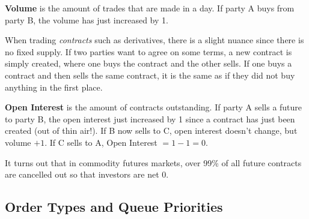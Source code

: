 \documentclass{article}
\begin{document}
    \begin{definition}[Volume]
      \textbf{Volume} is the amount of trades that are made in a day. If party A buys from party B, the volume has just increased by 1. 
    \end{definition}

    When trading \textit{contracts} such as derivatives, there is a slight nuance since there is no fixed supply. If two parties want to agree on some terms, a new contract is simply created, where one buys the contract and the other sells. If one buys a contract and then sells the same contract, it is the same as if they did not buy anything in the first place. 

    \begin{definition}
      \textbf{Open Interest} is the amount of contracts outstanding. If party A sells a future to party B, the open interest just increased by 1 since a contract has just been created (out of thin air!). If B now sells to C, open interest doesn't change, but volume $+1$. If C sells to A, Open Interest $= 1 - 1 = 0$.  
    \end{definition}

    It turns out that in commodity futures markets, over 99\% of all future contracts are cancelled out so that investors are net $0$. 

  \subsection{Order Types and Queue Priorities}
\end{document}
